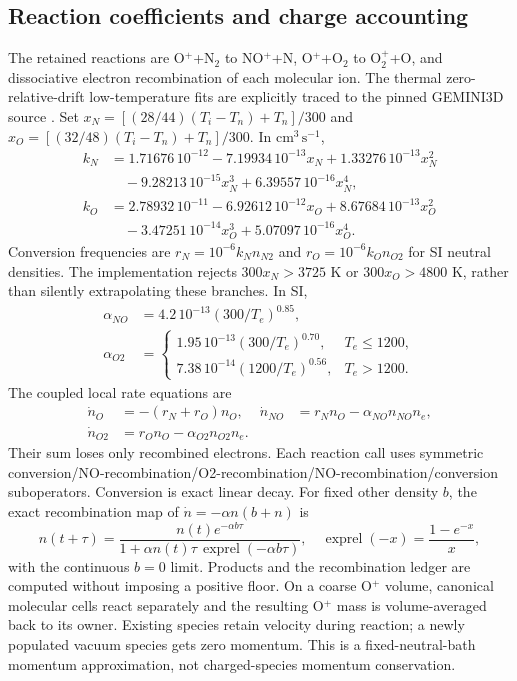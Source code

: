 \subsection{Reaction coefficients and charge accounting}
The retained reactions are O$^+$+N$_2$ to NO$^+$+N, O$^+$+O$_2$ to O$_2^+$+O,
and dissociative electron recombination of each molecular ion.
The thermal zero-relative-drift low-temperature fits are explicitly traced
to the pinned GEMINI3D source \citep{GEMINI}. Set
$x_N=[(28/44)(T_i-T_n)+T_n]/300$ and
$x_O=[(32/48)(T_i-T_n)+T_n]/300$. In $\mathrm{cm^3\,s^{-1}}$,
\begin{align}
 k_N&=1.71676\,10^{-12}-7.19934\,10^{-13}x_N
 +1.33276\,10^{-13}x_N^2\nonumber\\
 &\quad-9.28213\,10^{-15}x_N^3+6.39557\,10^{-16}x_N^4,\\
 k_O&=2.78932\,10^{-11}-6.92612\,10^{-12}x_O
 +8.67684\,10^{-13}x_O^2\nonumber\\
 &\quad-3.47251\,10^{-14}x_O^3+5.07097\,10^{-16}x_O^4.
\end{align}
Conversion frequencies are $r_N=10^{-6}k_N n_{N2}$ and
$r_O=10^{-6}k_O n_{O2}$ for SI neutral densities. The implementation rejects
$300x_N>3725$ K or $300x_O>4800$ K, rather than silently extrapolating these
branches. In SI,
\begin{align}
 \alpha_{NO}&=4.2\,10^{-13}(300/T_e)^{0.85},\\
 \alpha_{O2}&=\begin{cases}
 1.95\,10^{-13}(300/T_e)^{0.70},&T_e\le1200,\\
 7.38\,10^{-14}(1200/T_e)^{0.56},&T_e>1200.
 \end{cases}
\end{align}
The coupled local rate equations are
\begin{align}
 \dot n_O&=-(r_N+r_O)n_O,&
 \dot n_{NO}&=r_Nn_O-\alpha_{NO}n_{NO}n_e,\\
 \dot n_{O2}&=r_On_O-\alpha_{O2}n_{O2}n_e.&&
\end{align}
Their sum loses only recombined electrons. Each reaction call uses symmetric
conversion/NO-recombination/O2-recombination/NO-recombination/conversion
suboperators. Conversion is exact linear decay. For fixed other density $b$,
the exact recombination map of $\dot n=-\alpha n(b+n)$ is
\begin{equation}
 n(t+\tau)=\frac{n(t)e^{-\alpha b\tau}}
 {1+\alpha n(t)\tau\,\operatorname{exprel}(-\alpha b\tau)},\quad
 \operatorname{exprel}(-x)=\frac{1-e^{-x}}x,
\end{equation}
with the continuous $b=0$ limit. Products and the recombination ledger are
computed without imposing a positive floor. On a coarse O$^+$ volume,
canonical molecular cells react separately and the resulting O$^+$ mass is
volume-averaged back to its owner. Existing species retain velocity during
reaction; a newly populated vacuum species gets zero momentum. This is a
fixed-neutral-bath momentum approximation, not charged-species momentum
conservation.

